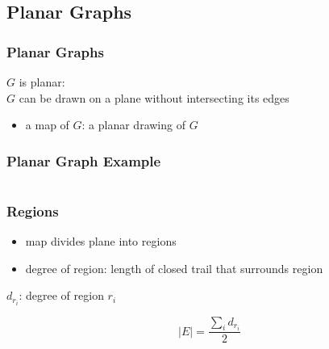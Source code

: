 \documentclass[dvipsnames]{beamer}
\begin{document}
\subsection{Planar Graphs}

\begin{frame}
  \frametitle{Planar Graphs}

  \begin{definition}
    $G$ is \alert{planar}:\\
    $G$ can be drawn on a plane without intersecting its edges
  \end{definition}

  \begin{itemize}
    \item a \alert{map} of $G$: a planar drawing of $G$
  \end{itemize}
\end{frame}

\begin{frame}
  \frametitle{Planar Graph Example}

  \begin{columns}
    \begin{center}
    \end{center}

    \begin{center}
    \end{center}
  \end{columns}
\end{frame}

\begin{frame}
  \frametitle{Regions}

  \begin{itemize}
    \item map divides plane into \alert{regions}
    \item degree of region: length of closed trail that surrounds region
  \end{itemize}

  \pause
  \begin{theorem}
    $d_{r_i}$: degree of region $r_i$

    \[ |E| = \frac{\sum_i d_{r_i}}{2} \]
  \end{theorem}
\end{frame}
\end{document}
